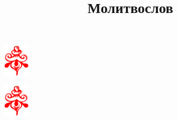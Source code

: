 \documentclass[oneside]{book}
\title{\Huge\bfseries Молитвослов}
\author{}
\date{}
\begin{document}
\maketitle
\tableofcontents


{\nopagebreak
\begin{center}
\includegraphics[width=0.1\textwidth]{uzor_end_red}
\end{center}}


{\nopagebreak
\begin{center}
\includegraphics[width=0.1\textwidth]{uzor_end_red}
\end{center}}
\end{document}
